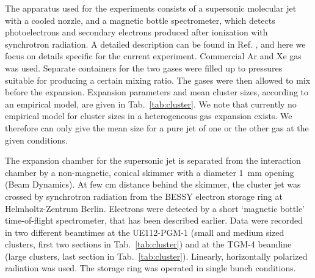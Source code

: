 %
%
The apparatus used for the experiments consists of a supersonic molecular jet with a cooled nozzle, and a magnetic bottle spectrometer, which detects photoelectrons and secondary electrons produced after ionization with synchrotron radiation.\cite{arion} 
A detailed description can be found in Ref. , and here we focus on details specific for the current experiment. Commercial Ar and Xe gas was used. 
Separate containers for the two gases were filled up to pressures suitable for producing a certain mixing ratio. The gases were then allowed to mix before the expansion. 
Expansion parameters and mean cluster sizes, according to an empirical model, are given in Tab.\ \ref{tab:cluster}. 
We note that currently no empirical model for cluster sizes in a heterogeneous gas expansion exists. 
We therefore can only give the mean size for a pure jet of one or the other gas at the given conditions. 

The expansion chamber for the supersonic jet is separated from the interaction chamber by a non-magnetic, conical skimmer with a diameter 1~mm opening (Beam Dynamics). 
At few cm distance behind the skimmer, the cluster jet was crossed by synchrotron radiation from the BESSY electron storage ring at Helmholtz-Zentrum Berlin. 
Electrons were detected by a short `magnetic bottle' time-of-flight spectrometer, that has been described earlier.\cite{mucke_review} 
Data were recorded in two different beamtimes at the UE112-PGM-1 (small and medium sized clusters, first two sections in Tab.\ \ref{tab:cluster}) and at the TGM-4 beamline (large clusters, last section in Tab.\ \ref{tab:cluster}). 
Linearly, horizontally polarized radiation was used. 
The storage ring was operated in single bunch conditions.




